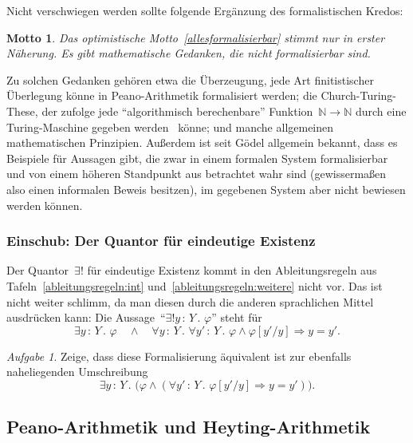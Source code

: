 \documentclass[a4paper,ngerman,12pt]{scrartcl}
\theoremstyle{definition}
\theoremstyle{plain}
\newtheorem{motto}[defn]{Motto}
\theoremstyle{remark}
\newtheorem{aufg}[defn]{Aufgabe}
\newcommand{\NN}{\mathbb{N}}
\renewcommand{\_}{\mathpunct{.}\,}
\newcommand{\?}{\,{:}\,}
\begin{document}
Nicht verschwiegen werden sollte folgende Ergänzung des formalistischen Kredos:
\begin{motto}Das optimistische Motto~\ref{allesformalisierbar} stimmt nur in
erster Näherung. Es gibt mathematische Gedanken, die nicht formalisierbar
sind.\end{motto}

Zu solchen Gedanken gehören etwa die Überzeugung, jede Art finitistischer
Über\-le\-gung könne in Peano-Arithmetik formalisiert werden; die
Church-Turing-These, der zufolge jede "`algorithmisch berechenbare"' Funktion~$\NN
\to \NN$ durch eine Turing-Maschine gegeben
werden~\cite{plato:ct,goldin:wegner:myth,church70} könne; und manche allgemeinen
mathematischen Prinzipien. Außerdem ist seit Gödel allgemein bekannt, dass es
Beispiele für Aussagen gibt, die zwar in einem formalen System formalisierbar und
von einem höheren Standpunkt aus betrachtet wahr sind (gewissermaßen also einen
informalen Beweis besitzen), im gegebenen System aber nicht bewiesen werden
können.


\subsubsection*{Einschub: Der Quantor für eindeutige Existenz}

Der Quantor~$\exists!$ für eindeutige Existenz kommt in den Ableitungsregeln aus
Tafeln~\ref{ableitungsregeln:int} und~\ref{ableitungsregeln:weitere} nicht vor.
Das ist nicht weiter schlimm, da man diesen durch die anderen sprachlichen
Mittel ausdrücken kann: Die Aussage~"`$\exists!y\?Y\_ \varphi$"' steht für
\[ \exists y\?Y\_ \varphi \quad\wedge\quad
  \forall y\?Y\_ \forall y'\?Y\_
  \varphi \wedge \varphi[y'/y] \Rightarrow y = y'. \]

\begin{aufg}Zeige, dass diese Formalisierung äquivalent ist zur ebenfalls
naheliegenden Umschreibung
\[ \exists y\?Y\_ \bigl(\varphi \wedge (\forall y'\?Y\_ \varphi[y'/y] \Rightarrow y =
y')\bigr). \]
\end{aufg}


\subsection{Peano-Arithmetik und Heyting-Arithmetik}
\end{document}

